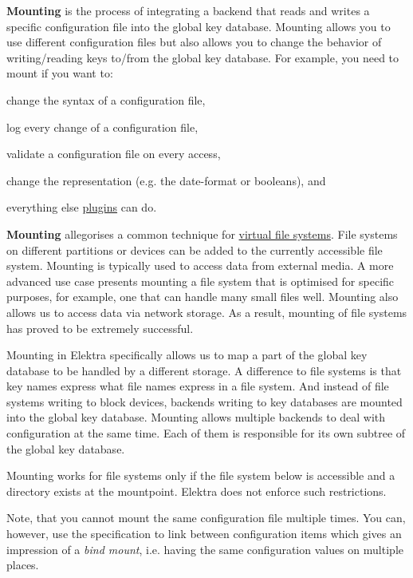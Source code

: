 {\bfseries Mounting} is the process of integrating a backend that reads and writes a specific configuration file into the global key database. Mounting allows you to use different configuration files but also allows you to change the behavior of writing/reading keys to/from the global key database. For example, you need to mount if you want to\+:


\begin{DoxyItemize}
\item change the syntax of a configuration file,
\item log every change of a configuration file,
\item validate a configuration file on every access,
\item change the representation (e.\+g. the date-\/format or booleans), and
\item everything else \hyperlink{md_src_plugins_README_src_plugins_README_md}{plugins} can do.
\end{DoxyItemize}

{\bfseries Mounting} allegorises a common technique for \hyperlink{doc_BIGPICTURE_md}{virtual file systems}. File systems on different partitions or devices can be added to the currently accessible file system. Mounting is typically used to access data from external media. A more advanced use case presents mounting a file system that is optimised for specific purposes, for example, one that can handle many small files well. Mounting also allows us to access data via network storage. As a result, mounting of file systems has proved to be extremely successful.

Mounting in Elektra specifically allows us to map a part of the global key database to be handled by a different storage. A difference to file systems is that key names express what file names express in a file system. And instead of file systems writing to block devices, backends writing to key databases are mounted into the global key database. Mounting allows multiple backends to deal with configuration at the same time. Each of them is responsible for its own subtree of the global key database.

Mounting works for file systems only if the file system below is accessible and a directory exists at the mountpoint. Elektra does not enforce such restrictions.

Note, that you cannot mount the same configuration file multiple times. You can, however, use the specification to link between configuration items which gives an impression of a {\itshape bind mount}, i.\+e. having the same configuration values on multiple places.


